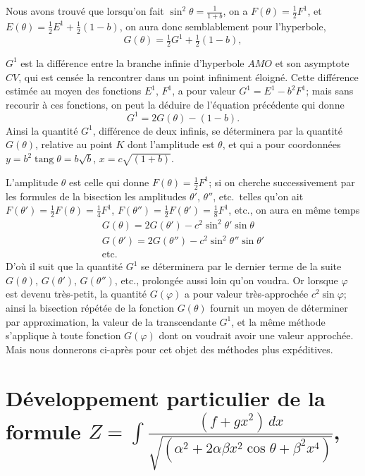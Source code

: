 \documentclass{article}
\begin{document}
Nous avons trouvé que lorsqu'on fait $\sin^{2}\theta=\frac{1}{1+b}$, on a $F(\theta)=\frac{1}{2}F^{1}$, et $E(\theta)=\frac{1}{2}E^{1}+\frac{1}{2}(1-b)$, on aura donc semblablement pour l'hyperbole,
\[ G(\theta)=\tfrac{1}{2}G^{1}+\tfrac{1}{2}(1-b), \]

$G^{1}$ est la différence entre la branche infinie d'hyperbole $AMO$ et son asymptote $CV$, qui est censée la rencontrer dans un point infiniment éloigné. Cette différence estimée au moyen des fonctions $E^{1}$, $F^{1}$, a pour valeur $G^{1}=E^{1}-b^{2}F^{1}$; mais sans recourir à ces fonctions, on peut la déduire de l'équation précédente qui donne
\[ G^{1}=2G(\theta)-(1-b). \]
Ainsi la quantité $G^{1}$, différence de deux infinis, se déterminera par la quantité $G(\theta)$, relative au point $K$ dont l'amplitude est $\theta$, et qui a pour coordonnées $y=b^{2}\operatorname{tang}\theta=b\sqrt{b}$, $x=c\sqrt{(1+b)}$.

L'amplitude $\theta$ est celle qui donne $F(\theta)=\frac{1}{2}F^{1}$; si on cherche successivement par les formules de la bisection les amplitudes $\theta'$, $\theta''$, etc.\ telles qu'on ait $F(\theta')=\frac{1}{2}F(\theta)=\frac{1}{4}F^{1}$, $F(\theta'')=\frac{1}{2}F(\theta')=\frac{1}{8}F^{1}$, etc., on aura en même temps
\[ \begin{gathered} G(\theta)=2G(\theta')-c^{2}\sin^{2}\theta'\sin\theta\\ G(\theta')=2G(\theta'')-c^{2}\sin^{2}\theta''\sin\theta'\\ \text{etc.} \end{gathered} \]
D'où il suit que la quantité $G^{1}$ se déterminera par le dernier terme de la suite $G(\theta)$, $G(\theta')$, $G(\theta'')$, etc., prolongée aussi loin qu'on voudra. Or lorsque $\varphi$ est devenu très-petit, la quantité $G(\varphi)$ a pour valeur très-approchée $c^{2}\sin\varphi$; ainsi la bisection répétée de la fonction $G(\theta)$ fournit un moyen de déterminer par approximation, la valeur de la transcendante $G^{1}$, et la même méthode s'applique à toute fonction $G(\varphi)$ dont on voudrait avoir une valeur approchée. Mais nous donnerons ci-après pour cet objet des méthodes plus expéditives.

\section*{Développement particulier de la formule $Z=\displaystyle\int\frac{(f+gx^{2})\,dx}{\sqrt{(\alpha^{2}+2\alpha\beta x^{2}\cos\theta+\beta^{2}x^{4})}}$,}
\end{document}
